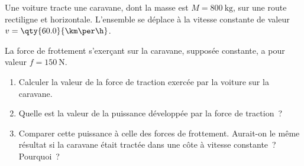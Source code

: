 Une voiture tracte une caravane, dont la masse est $M=\qty{800}{\kg}$, sur une
route rectiligne et horizontale. L'ensemble se déplace à la vitesse constante de
valeur $v=\qty{60.0}{\km\per\h}$.

La force de frottement s'exerçant sur la caravane, supposée constante, a pour
valeur $f=\qty{150}{\N}$.
\begin{enumerate}
    \item Calculer la valeur de la force de traction exercée par la voiture sur
          la caravane.
    \item Quelle est la valeur de la puissance développée par la force de
          traction~?
    \item Comparer cette puissance à celle des forces de frottement. Aurait-on
          le même résultat si la caravane était tractée dans une côte à vitesse
          constante~? Pourquoi~?
\end{enumerate}

